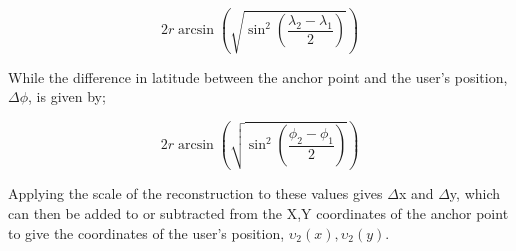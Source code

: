 \begin{equation}
2r \arcsin\left( \sqrt{\sin^{2} \left( \frac{\lambda_{2} - \lambda_{1}}{2} \right) } \right)
\end{equation}

While the difference in latitude between the anchor point and the user's position, $\Delta\phi$, is given by;

\begin{equation}
2r \arcsin\left( \sqrt{\sin^{2} \left( \frac{\phi_{2} - \phi_{1}}{2}\right)} \right)
\end{equation}

Applying the scale of the reconstruction to these values gives $\Delta$x and $\Delta$y, which can then be added to or subtracted from the X,Y coordinates of the anchor point to give the coordinates of the user's position, $\upsilon_{2}(x),\upsilon_{2}(y)$.




